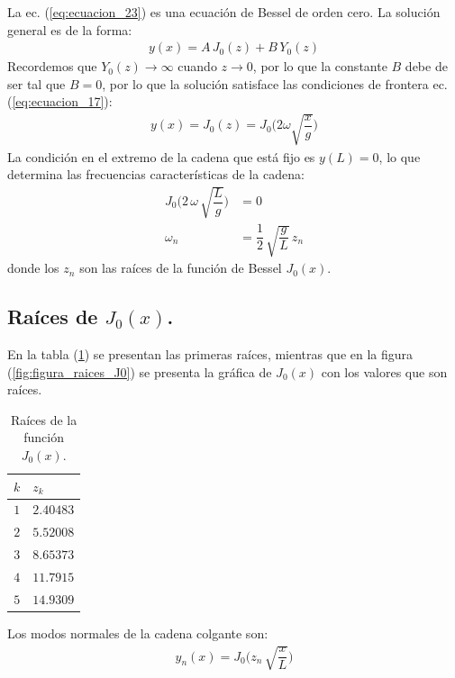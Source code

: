 La ec. (\ref{eq:ecuacion_23}) es una ecuación de Bessel de orden cero. La solución general es de la forma:
\begin{align*}
y (x) = A \, J_{0} (z) + B \, Y_{0} (z)
\end{align*}
Recordemos que $Y_{0} (z) \to \infty$ cuando $z \to 0$, por lo que la constante $B$ debe de ser tal que $B = 0$, por lo que la solución satisface las condiciones de frontera ec. (\ref{eq:ecuacion_17}):
\begin{align}
y (x) = J_{0} (z) = J_{0} \bigg( 2 \omega \sqrt{\dfrac{x}{g}} \bigg)
\label{eq:ecuacion_24}
\end{align}
La condición en el extremo de la cadena que está fijo es $y (L) = 0$, lo que determina las frecuencias características de la cadena:
\begin{align}
J_{0} \bigg( 2 \, \omega \, \sqrt{\dfrac{L}{g}} \bigg) &= 0 \label{eq:ecuacion_25} \\[0.5em]
\omega_{n} &= \dfrac{1}{2} \, \sqrt{\dfrac{g}{L}} \, z_{n} \label{eq:ecuacion_26}
\end{align}
donde los $z_{n}$ son las raíces de la función de Bessel $J_{0} (x)$.

\subsection{Raíces de \texorpdfstring{$J_{0} (x)$}{J0 (x)}.}

En la tabla (\ref{table_Tabla_Ceros_J0}) se presentan las primeras raíces, mientras que en la figura (\ref{fig:figura_raices_J0}) se presenta la gráfica de $J_{0} (x)$ con los valores que son raíces.
\begin{table}[H]
\centering
\large
\begin{tabular}{c | l}
$k$ & $z_{k}$ \\ \hline
$1$ & $2.40483$ \\
$2$ & $5.52008$ \\
$3$ & $8.65373$ \\
$4$ & $11.7915$ \\
$5$ & $14.9309$ \\
\end{tabular}
\caption{Raíces de la función $J_{0} (x)$.}
\label{table_Tabla_Ceros_J0}
\end{table}
Los modos normales de la cadena colgante son:
\begin{align}
y_{n} (x) = J_{0} \bigg( z_{n} \, \sqrt{\dfrac{x}{L}} \bigg)
\label{eq:ecuacion_28}
\end{align}

